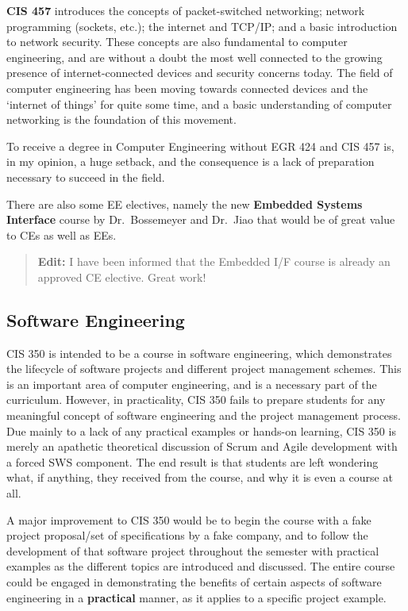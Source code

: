 \documentclass[12pt]{article}
\numberwithin{figure}{section}
\numberwithin{equation}{section}
\begin{document}
{\bigskip

\textbf{CIS 457} introduces the concepts of packet-switched networking;
network programming (sockets, etc.); the internet and TCP/IP; and a
basic introduction to network security. These concepts are also
fundamental to computer engineering, and are without a doubt the most
well connected to the growing presence of internet-connected devices and
security concerns today. The field of computer engineering has been
moving towards connected devices and the `internet of things' for quite
some time, and a basic understanding of computer networking is the
foundation of this movement.

\bigskip

To receive a degree in Computer Engineering without EGR 424 and CIS 457
is, in my opinion, a huge setback, and the consequence is a lack of
preparation necessary to succeed in the field.

\bigskip

There are also some EE electives, namely the new \textbf{Embedded
Systems Interface} course by Dr.~Bossemeyer and Dr.~Jiao that would be
of great value to CEs as well as EEs.

\bigskip

\begin{quote}
\textbf{Edit:} I have been informed that the Embedded I/F course is already an approved CE elective. Great work!
\end{quote}

\subsection{Software Engineering}\label{software-engineering}
CIS 350 is intended to be a course in software engineering, which
demonstrates the lifecycle of software projects and different project
management schemes. This is an important area of computer engineering,
and is a necessary part of the curriculum. However, in practicality, CIS
350 fails to prepare students for any meaningful concept of software
engineering and the project management process. Due mainly to a lack of
any practical examples or hands-on learning, CIS 350 is merely an
apathetic theoretical discussion of Scrum and Agile development with a
forced SWS component. The end result is that students are left wondering
what, if anything, they received from the course, and why it is even a
course at all.

\bigskip

A major improvement to CIS 350 would be to begin the course with a fake
project proposal/set of specifications by a fake company, and to follow
the development of that software project throughout the semester with
practical examples as the different topics are introduced and discussed.
The entire course could be engaged in demonstrating the benefits of
certain aspects of software engineering in a \textbf{practical} manner,
as it applies to a specific project example.

}
\end{document}
